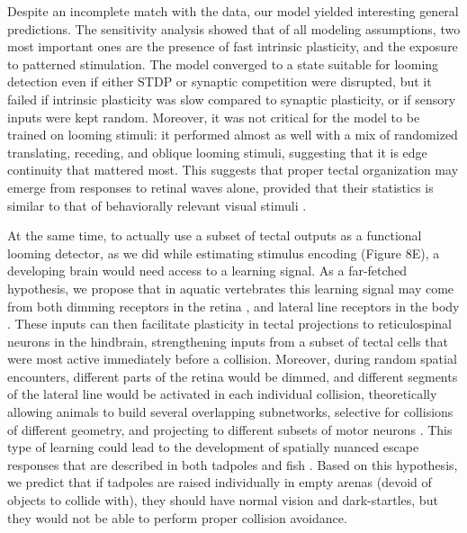 \documentclass{article}
\begin{document}
Despite an incomplete match with the data, our model yielded interesting general predictions. The sensitivity analysis showed that of all modeling assumptions, two most important ones are the presence of fast intrinsic plasticity, and the exposure to patterned stimulation. The model converged to a state suitable for looming detection even if either STDP or synaptic competition were disrupted, but it failed if intrinsic plasticity was slow compared to synaptic plasticity, or if sensory inputs were kept random. Moreover, it was not critical for the model to be trained on looming stimuli: it performed almost as well with a mix of randomized translating, receding, and oblique looming stimuli, suggesting that it is edge continuity that mattered most. This suggests that proper tectal organization may emerge from responses to retinal waves alone, provided that their statistics is similar to that of behaviorally relevant visual stimuli \citep{huberman2008waves}. %

At the same time, to actually use a subset of tectal outputs as a functional looming detector, as we did while estimating stimulus encoding (Figure 8E), a developing brain would need access to a learning signal. As a far-fetched hypothesis, we propose that in aquatic vertebrates this learning signal may come from both dimming receptors in the retina \citep{ishikane2005, baranauskas2012}, and lateral line receptors in the body \citep{pratt2009multisens, felch2016, truszkowski2017}. These inputs can then facilitate plasticity in tectal projections to reticulospinal neurons in the hindbrain, strengthening inputs from a subset of tectal cells that were most active immediately before a collision. Moreover, during random spatial encounters, different parts of the retina would be dimmed, and different segments of the lateral line would be activated in each individual collision, theoretically allowing animals to build several overlapping subnetworks, selective for collisions of different geometry, and projecting to different subsets of motor neurons \citep{frost2004review, helmbrecht2018topography}. This type of learning could lead to the development of spatially nuanced escape responses that are described in both tadpoles \citep{khakhalin2014} and fish \citep{bhattacharyya2017assessment}. Based on this hypothesis, we predict that if tadpoles are raised individually in empty arenas (devoid of objects to collide with), they should have normal vision and dark-startles, but they would not be able to perform proper collision avoidance.
\end{document}

